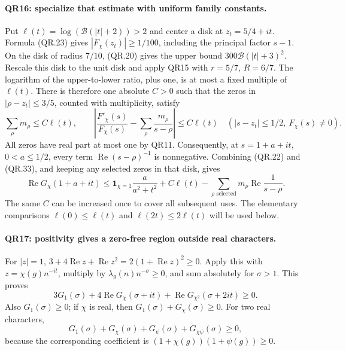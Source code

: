 \paragraph{QR16: specialize that estimate with uniform family constants.}
Put $\ell(t)=\log(\mathcal B(|t|+2))>2$ and center a disk at
$z_t=5/4+it$. Formula (QR.23) gives
$|F_\chi(z_t)|\ge1/100$, including the principal factor $s-1$.
On the disk of radius $7/10$, (QR.20) gives the upper bound
$300\mathcal B(|t|+3)^2$. Rescale this disk to the unit disk
and apply QR15 with $r=5/7$, $R=6/7$. The logarithm of the
upper-to-lower ratio, plus one, is at most a fixed multiple of
$\ell(t)$. There is therefore one absolute $C>0$ such that
the zeros in $|\rho-z_t|\le3/5$, counted with multiplicity,
satisfy
\[
 \sum_\rho m_\rho\le C\ell(t),\qquad
 \left|\frac{F'_\chi(s)}{F_\chi(s)}
                   -\sum_\rho\frac{m_\rho}{s-\rho}\right|
          \le C\ell(t)\quad(|s-z_t|\le1/2,\ F_\chi(s)\ne0).
                                                               \tag{QR.33}
\]
All zeros have real part at most one by QR11. Consequently, at
$s=1+a+it$, $0<a\le1/2$, every term
$\operatorname{Re}(s-\rho)^{-1}$ is nonnegative. Combining
(QR.22) and (QR.33), and keeping any selected zeros in that disk,
gives
\[
 \operatorname{Re}G_\chi(1+a+it)
 \le\mathbf1_{\chi=1}\frac{a}{a^2+t^2}+C\ell(t)
         -\sum_{\rho\text{ selected}}m_\rho
                                      \operatorname{Re}\frac1{s-\rho}.
                                                               \tag{QR.34}
\]
The same $C$ can be increased once to cover all subsequent uses.
The elementary comparisons $\ell(0)\le\ell(t)$ and
$\ell(2t)\le2\ell(t)$ will be used below.

\paragraph{QR17: positivity gives a zero-free region outside real characters.}
For $|z|=1$,
$3+4\operatorname{Re}z+\operatorname{Re}z^2
 =2(1+\operatorname{Re}z)^2\ge0$.
Apply this with $z=\chi(g)n^{-it}$, multiply by
$\lambda_g(n)n^{-\sigma}\ge0$, and sum absolutely for $\sigma>1$.
This proves
\[
 3G_1(\sigma)+4\operatorname{Re}G_\chi(\sigma+it)
              +\operatorname{Re}G_{\chi^2}(\sigma+2it)\ge0.\tag{QR.35}
\]
Also $G_1(\sigma)\ge0$; if $\chi$ is real, then
$G_1(\sigma)+G_\chi(\sigma)\ge0$. For two real characters,
\[
 G_1(\sigma)+G_\chi(\sigma)+G_\psi(\sigma)
                                +G_{\chi\psi}(\sigma)\ge0,\tag{QR.36}
\]
because the corresponding coefficient is
$(1+\chi(g))(1+\psi(g))\ge0$.


